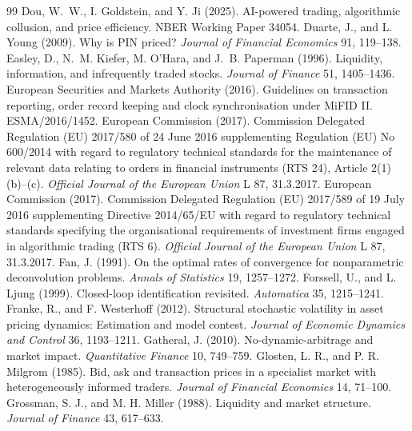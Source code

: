 \begin{thebibliography}{99}
 Dou, W.~W., I. Goldstein, and Y. Ji (2025). AI-powered trading, algorithmic collusion, and price efficiency. NBER Working Paper 34054.
 Duarte, J., and L. Young (2009). Why is PIN priced? \emph{Journal of Financial Economics} 91, 119--138.
 Easley, D., N.~M. Kiefer, M. O'Hara, and J.~B. Paperman (1996). Liquidity, information, and infrequently traded stocks. \emph{Journal of Finance} 51, 1405--1436.
 European Securities and Markets Authority (2016). Guidelines on transaction reporting, order record keeping and clock synchronisation under MiFID II. ESMA/2016/1452.
 European Commission (2017). Commission Delegated Regulation (EU) 2017/580 of 24 June 2016 supplementing Regulation (EU) No 600/2014 with regard to regulatory technical standards for the maintenance of relevant data relating to orders in financial instruments (RTS 24), Article 2(1)(b)--(c). \emph{Official Journal of the European Union} L 87, 31.3.2017.
 European Commission (2017). Commission Delegated Regulation (EU) 2017/589 of 19 July 2016 supplementing Directive 2014/65/EU with regard to regulatory technical standards specifying the organisational requirements of investment firms engaged in algorithmic trading (RTS 6). \emph{Official Journal of the European Union} L 87, 31.3.2017.
 Fan, J. (1991). On the optimal rates of convergence for nonparametric deconvolution problems. \emph{Annals of Statistics} 19, 1257--1272.
 Forssell, U., and L. Ljung (1999). Closed-loop identification revisited. \emph{Automatica} 35, 1215--1241.
 Franke, R., and F. Westerhoff (2012). Structural stochastic volatility in asset pricing dynamics: Estimation and model contest. \emph{Journal of Economic Dynamics and Control} 36, 1193--1211.
 Gatheral, J. (2010). No-dynamic-arbitrage and market impact. \emph{Quantitative Finance} 10, 749--759.
 Glosten, L. R., and P. R. Milgrom (1985). Bid, ask and transaction prices in a specialist market with heterogeneously informed traders. \emph{Journal of Financial Economics} 14, 71--100.
 Grossman, S. J., and M. H. Miller (1988). Liquidity and market structure. \emph{Journal of Finance} 43, 617--633.


\end{thebibliography}
